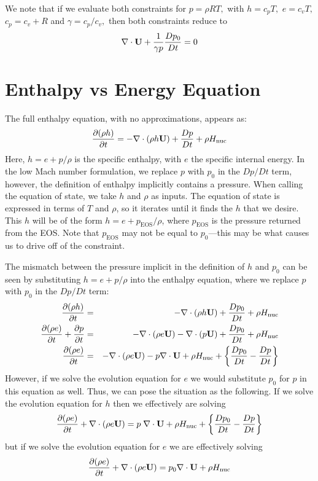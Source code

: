We note that if we evaluate both constraints for $p = \rho R T,$ with $h = c_p T,$ $e = c_v T,$
$c_p = c_v + R$ and $\gamma = c_p / c_v,$ then both constraints reduce to 
\begin{equation}
\nabla \cdot {\bf U} + \frac{1}{\gamma p} \frac{D p_0}{D t} = 0
\end{equation}

\section{Enthalpy vs Energy Equation}

The full enthalpy equation, with no approximations, appears as:
\begin{equation}
\frac{\partial(\rho h)}{\partial t} = -\nabla\cdot(\rho h{\bf U}) + 
  \frac{Dp}{Dt} + \rho{H_{\rm nuc}} \label{eq:enthalpy}
\end{equation}
Here, $h = e + p/\rho$ is the specific enthalpy, with $e$ the specific
internal energy.  In the low Mach number formulation, we replace $p$
with $p_0$ in the $Dp/Dt$ term, however, the definition of enthalpy
implicitly contains a pressure.  When calling the equation of state,
we take $h$ and $\rho$ as inputs.  The equation of state is expressed
in terms of $T$ and $\rho$, so it iterates until it finds the $h$ that
we desire.  This $h$ will be of the form $h = e + p_\mathrm{EOS}/\rho$,
where $p_\mathrm{EOS}$ is the pressure returned from the EOS.  Note that
$p_\mathrm{EOS}$ may not be equal to $p_0$---this may be what
causes us to drive off of the constraint. 

The mismatch between the pressure implicit in the definition of $h$
and $p_0$ can be seen by substituting $h = e + p/\rho$ into the
enthalpy equation, where we replace $p$ with $p_0$ in the $Dp/Dt$ term:
\begin{eqnarray}
\frac{\partial(\rho h)}{\partial t} &=& -\nabla\cdot(\rho h\Ub) + 
  \frac{Dp_0}{Dt} + \rho\Hnuc \nonumber \\
%
\frac{\partial(\rho e)}{\partial t} + \frac{\partial p}{\partial t} &=&
 -\nabla\cdot(\rho e\Ub) -\nabla\cdot(p\Ub) + \frac{Dp_0}{Dt} + \rho\Hnuc \nonumber \\
%
\frac{\partial(\rho e)}{\partial t} &=&
 -\nabla\cdot(\rho e\Ub) - p\nabla\cdot\Ub + \rho\Hnuc + 
  \left \{ \frac{Dp_0}{Dt} - \frac{Dp}{Dt} \right \} \nonumber 
\end{eqnarray}
However, if we solve the evolution equation for $e$ we would substitute 
$p_0$ for $p$ in this equation as well.  Thus, we can pose the situation as the following.  
If we solve the evolution equation for $h$ then we effectively are solving
\begin{equation}
\frac{\partial(\rho e)}{\partial t} +
  \nabla\cdot(\rho e{\bf U}) = p \; \nabla\cdot{\bf U} + \rho{H_{\rm nuc}} + 
  \left \{ \frac{Dp_0}{Dt} - \frac{Dp}{Dt} \right \} \nonumber 
\end{equation}
but if we solve the evolution equation for $e$ we are effectively solving
\begin{equation}
\frac{\partial(\rho e)}{\partial t} +
  \nabla\cdot(\rho e{\bf U}) = p_0 \nabla\cdot{\bf U} + \rho{H_{\rm nuc}} \nonumber 
\end{equation}

